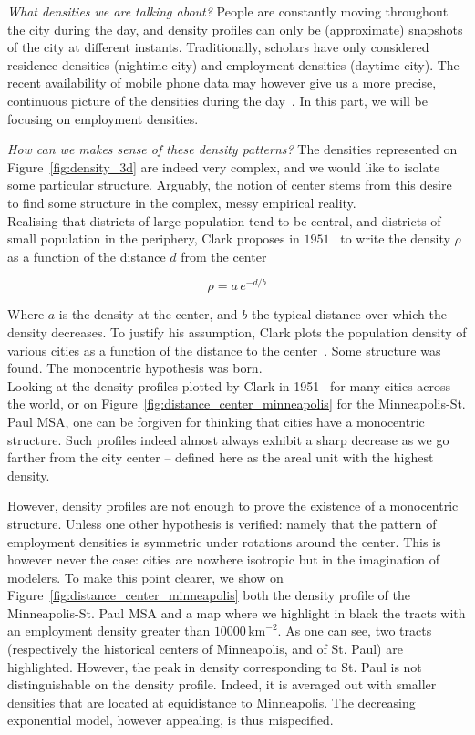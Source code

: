 \emph{What densities we are talking about?} People are constantly moving
throughout the city during the day, and density profiles can only be
(approximate) snapshots of the city at different instants.  Traditionally,
scholars have only considered residence densities (nightime city) and employment
densities (daytime city). The recent availability of mobile phone data may
however give us a more precise, continuous picture of the densities during the
day~\cite{Louail:2014}. In this part, we will be focusing on employment
densities.

\emph{How can we makes sense of these density patterns?} The densities represented
on Figure~\ref{fig:density_3d} are indeed very complex, and we would like to
isolate some particular structure. Arguably, the notion of center stems from
this desire to find some structure in the complex, messy empirical reality. \\

Realising that districts of large population tend to be central, and
districts of small population in the periphery, Clark proposes in
$1951$~\cite{Clark:1951} to write the density $\rho$ as a function of the
distance $d$ from the center

\begin{equation}
    \rho = a\,e^{-d/b} 
\end{equation}

Where $a$ is the density at the center, and $b$ the typical distance over which
the density decreases. To justify his assumption, Clark plots the population
density of various cities as a function of the distance to the
center~\cite{Clark:1951}. Some structure was found. The monocentric hypothesis
was born.\\


Looking at the density profiles plotted by Clark in 1951~\cite{Clark:1951} for
many cities across the world, or on Figure~\ref{fig:distance_center_minneapolis}
for the Minneapolis-St. Paul MSA, one can be
forgiven for thinking that cities have a monocentric structure. Such profiles
indeed almost always exhibit a sharp decrease as we go farther from the city
center -- defined here as the areal unit with the highest density. 

However, density profiles are not enough to prove the existence of a monocentric
structure. Unless one other hypothesis is verified: namely that the pattern of
employment densities is symmetric under rotations around the center. This is
however never the case: cities are nowhere isotropic but in the imagination of
modelers. To make this point clearer, we show on
Figure~\ref{fig:distance_center_minneapolis} both the density profile of the
Minneapolis-St. Paul MSA and a map where we highlight in black the tracts with
an employment density greater than $10000\,\text{km}^{-2}$. As one can see, two
tracts (respectively the historical centers of Minneapolis, and of St. Paul) are
highlighted. However, the peak in density corresponding to St. Paul is not
distinguishable on the density profile.  Indeed, it is averaged out with smaller
densities that are located at equidistance to Minneapolis. The decreasing
exponential model, however appealing, is thus mispecified.\\


